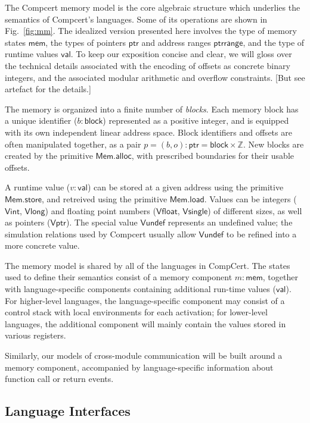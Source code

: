 \documentclass[acmsmall,timestamp,review]{acmart}
\newcommand{\kw}[1]{\ensuremath{ \mathsf{#1} }}
\begin{document}
The Compcert memory model \cite{compcertmmv2}
is the core algebraic structure
which underlies the semantics of Compcert's languages.
Some of its operations
are shown in Fig.~\ref{fig:mm}.
The idealized version presented here
involves
the type of memory states \kw{mem},
the types of pointers \kw{ptr} and address ranges \kw{ptrrange}, and
the type of runtime values \kw{val}.
To keep our exposition concise and clear,
we will gloss over the technical details
associated with the encoding of offsets
as concrete binary integers,
and the associated modular arithmetic and overflow constraints.
[But see artefact for the details.]

The memory is organized into a finite number of \emph{blocks}.
Each memory block has a unique identifier ($b : \kw{block}$)
represented as a positive integer,
and is equipped with its own independent linear address space.
Block identifiers and offsets are often manipulated together,
as a pair $p = (b, o) : \kw{ptr} = \kw{block} \times \mathbb{Z}$.
New blocks are created by the primitive $\kw{Mem.alloc}$,
with prescribed boundaries for their usable offsets.

A runtime value ($v : \kw{val}$) can be stored at
a given address using the primitive \kw{Mem.store},
and retreived using the primitive \kw{Mem.load}.
Values can be integers (\kw{Vint}, \kw{Vlong}) and
floating point numbers (\kw{Vfloat}, \kw{Vsingle})
of different sizes,
as well as pointers (\kw{Vptr}).
The special value \kw{Vundef}
represents an undefined value;
the simulation relations used by Compcert
usually allow $\kw{Vundef}$
to be refined into a more concrete value.

The memory model is shared by all of the languages in CompCert.
The states used to define their semantics consist of
a memory component $m : \kw{mem}$,
together with language-specific components
containing additional run-time values ($\kw{val}$).
For higher-level languages,
the language-specific component may consist of
a control stack with local environments for each activation;
for lower-level languages,
the additional component will mainly contain
the values stored in various registers.

Similarly,
our models of cross-module communication
will be built around a memory component,
accompanied by language-specific information
about function call or return events.


\subsection{Language Interfaces} %
\end{document}
